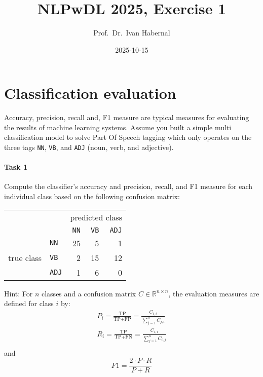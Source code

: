 \documentclass[11pt,a4wide,oneside]{article}
\title{NLPwDL 2025, Exercise 1}
\author{Prof.\ Dr.\ Ivan Habernal}
\date{2025-10-15}
\begin{document}
\maketitle

\section{Classification evaluation}

Accuracy, precision, recall and, F1 measure are typical measures for evaluating the results of machine learning systems.
Assume you built a simple multi classification model to solve Part Of Speech tagging which only operates on the three tags \texttt{NN}, \texttt{VB}, and \texttt{ADJ} (noun, verb, and adjective).


\paragraph{Task 1}
Compute the classifier's accuracy and precision, recall, and F1 measure for each individual class based on the following confusion matrix:
\begin{table}[h]
	\centering
	\begin{tabular}{ll|rrr}
		&				& \multicolumn{3}{c}{predicted class} \\
		&				& \texttt{NN}	& \texttt{VB}	& \texttt{ADJ} \\
		\cline{2-5}
		& \texttt{NN}	& 25			& 5				& 1 \\
		true class		& \texttt{VB}	& 2				& 15			& 12 \\
		& \texttt{ADJ}	& 1				& 6				& 0 \\
	\end{tabular}
\end{table}

Hint: For $n$ classes and a confusion matrix $C \in \mathbb{R}^{n \times n}$, the evaluation measures are defined for class $i$ by:
\begin{align*}
	P_i = \frac{\text{TP}}{\text{TP+FP}} = \frac{C_{i,i}}{\sum_{j=1}^n C_{j,i}} \\
	R_i = \frac{\text{TP}}{\text{TP+FN}} = \frac{C_{i,i}}{\sum_{j=1}^n C_{i,j}} \\
\end{align*}
and
\[\mathit{F1} = \frac{2 \cdot P \cdot R}{P + R}\]
\end{document}
